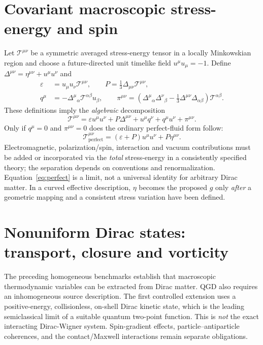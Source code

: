 \documentclass[11pt,a4paper]{article}
\newcommand{\TT}{\mathcal T}
\begin{document}
\section{Covariant macroscopic stress-energy and spin}\label{sec:fluid}
Let $\TT^{\mu\nu}$ be a symmetric averaged stress-energy tensor in a locally Minkowskian region and choose a future-directed unit timelike field $u^\mu u_\mu=-1$. Define $\Delta^{\mu\nu}=\eta^{\mu\nu}+u^\mu u^\nu$ and
\begin{align}\label{eq:decomp-def}
\varepsilon&=u_\mu u_\nu\TT^{\mu\nu},\qquad
P=\tfrac13\Delta_{\mu\nu}\TT^{\mu\nu},\\
q^\mu&=-\Delta^\mu{}_{\alpha}\TT^{\alpha\beta}u_\beta,\qquad
\pi^{\mu\nu}=\left(\Delta^\mu{}_{\alpha}\Delta^\nu{}_{\beta}
-\tfrac13\Delta^{\mu\nu}\Delta_{\alpha\beta}\right)\TT^{\alpha\beta}.
\end{align}
These definitions imply the \emph{algebraic} decomposition
\begin{equation}\label{eq:decomp}
\TT^{\mu\nu}=\varepsilon u^\mu u^\nu+P\Delta^{\mu\nu}
+u^\mu q^\nu+q^\mu u^\nu+\pi^{\mu\nu}.
\end{equation}
Only if $q^\mu=0$ and $\pi^{\mu\nu}=0$ does the ordinary perfect-fluid form follow:
\begin{equation}\label{eq:perfect}
\boxed{\TT^{\mu\nu}_{\mathrm{perfect}}=(\varepsilon+P)u^\mu u^\nu+P\eta^{\mu\nu}.}
\end{equation}
Electromagnetic, polarization/spin, interaction and vacuum contributions must be added or incorporated via the \emph{total} stress-energy in a consistently specified theory; the separation depends on conventions and renormalization. Equation~\eqref{eq:perfect} is a limit, not a universal identity for arbitrary Dirac matter. In a curved effective description, $\eta$ becomes the proposed $g$ only \emph{after} a geometric mapping and a consistent stress variation have been defined.


\section{Nonuniform Dirac states: transport, closure and vorticity}\label{sec:nonuniform}
The preceding homogeneous benchmarks establish that macroscopic thermodynamic variables can be extracted from Dirac matter. QGD also requires an inhomogeneous source description. The first controlled extension uses a positive-energy, collisionless, on-shell Dirac kinetic state, which is the leading semiclassical limit of a suitable quantum two-point function. This is \emph{not} the exact interacting Dirac-Wigner system. Spin-gradient effects, particle--antiparticle coherences, and the contact/Maxwell interactions remain separate obligations.
\end{document}
